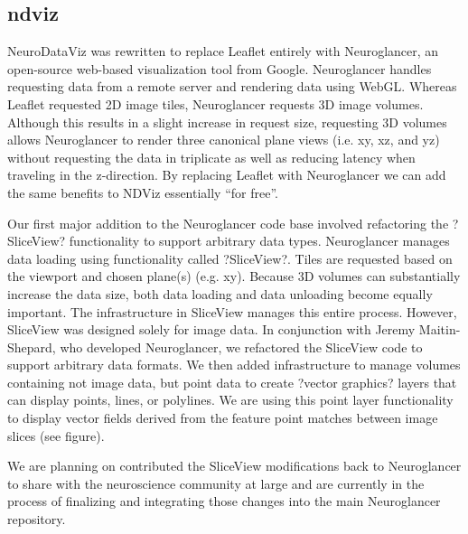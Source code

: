 \documentclass[simplex.tex]{subfiles}
\begin{document}
\subsection[ndviz]{ndviz}

NeuroDataViz was rewritten to replace Leaflet entirely with Neuroglancer, an open-source web-based visualization tool from Google. Neuroglancer handles requesting data from a remote server and rendering data using WebGL. Whereas Leaflet requested 2D image tiles, Neuroglancer requests 3D image volumes. Although this results in a slight increase in request size, requesting 3D volumes allows Neuroglancer to render three canonical plane views (i.e. xy, xz, and yz) without requesting the data in triplicate as well as reducing latency when traveling in the z-direction. By replacing Leaflet with Neuroglancer we can add the same benefits to NDViz essentially ``for free''. 

Our first major addition to the Neuroglancer code base involved refactoring the ?SliceView? functionality to support arbitrary data types. Neuroglancer manages data loading using functionality called ?SliceView?. Tiles are requested based on the viewport and chosen plane(s) (e.g. xy). Because 3D volumes can substantially increase the data size, both data loading and data unloading become equally important. The infrastructure in SliceView manages this entire process. However, SliceView was designed solely for image data. In conjunction with Jeremy Maitin-Shepard, who developed Neuroglancer, we refactored the SliceView code to support arbitrary data formats. We then added infrastructure to manage volumes containing not image data, but point data to create ?vector graphics? layers that can display points, lines, or polylines. We are using this point layer functionality to display vector fields derived from the feature point matches between image slices (see figure).

We are planning on contributed the SliceView modifications back to Neuroglancer to share with the neuroscience community at large and are currently in the process of finalizing and integrating those changes into the main Neuroglancer repository.
\end{document}
